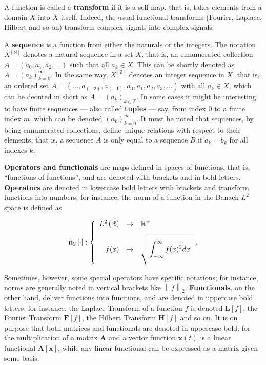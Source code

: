 	A function is called a \textbf{transform} if it is a self-map, that is, takes elements from a domain $X$ into $X$ itself. Indeed, the usual functional transforms (Fourier, Laplace, Hilbert and so on) transform complex signals into complex signals.

	A \textbf{sequence} is a function from either the naturals or the integers. The notation $X^{\left[\mathbb{N}\right]}$ denotes a natural sequence in a set $X$, that is, an ennumerated collection $A = \left(a_0,a_1,a_2,...\right)$ such that all $a_k\in X$. This can be shortly denoted as $A = \left(a_k\right)_{k=0}^\infty$. In the same way, $X^{\left[\mathbb{Z}\right]}$ denotes an integer sequence in $X$, that is, an ordered set $A = \left(...,a_{(-2)},a_{(-1)},a_0,a_1,a_2,a_3,...\right)$ with all $a_k\in X$, which can be deonted in short as $A = \left(a_k\right)_{k\in\mathbb{Z}}$. In some cases it might be interesting to have finite sequences — also called \textbf{tuples} — say, from index 0 to a finite index $m$, which can be denoted $\left(a_k\right)_{k=0}^m$. It must be noted that sequences, by being ennumerated collections, define unique relations with respect to their elements, that is, a sequence $A$ is only equal to a sequence $B$ if $a_k = b_k$ for all indexes $k$.

	\textbf{Operators and functionals} are maps defined in spaces of functions, that is, ``functions of functions'', and are denoted with brackets and in bold letters. \textbf{Operators} are denoted in lowercase bold letters with brackets and transform functions into numbers; for instance, the norm of a function in the Banach $L^2$ space is defined as

\begin{equation} \mathbf{n}_2\left[\cdot\right] : \left\{\begin{array}{rcl} L^2\left(\mathbb{R}\right) &\to& \mathbb{R}^+ \\[3mm] f(x) &\mapsto& \sqrt{\raisebox{0mm}[7mm][6mm]{} \displaystyle\int_{-\infty}^{\infty} f(x)^2 dx}\end{array}\right.  .\end{equation}

	Sometimes, however, some special operators have specific notations; for instance, norms are generally noted in vertical brackets like $\left\lVert f \right\rVert_2$. \textbf{Functionals}, on the other hand, deliver functions into functions, and are denoted in uppercase bold letters; for instance, the Laplace Transform of a function $f$ is denoted $\mathbf{L}\left[f\right]$, the Fourier Transform $\mathbf{F}\left[f\right]$, the Hilbert Transform $\mathbf{H}\left[f\right]$ and so on. It is on purpose that both matrices and functionals are denoted in uppercase bold, for the multiplication of a matrix $\mathbf{A}$ and a vector function $\mathbf{x}(t)$ is a linear functional $\mathbf{A}\left[\mathbf{x}\right]$, while any linear functional can be expressed as a matrix given some basis.


